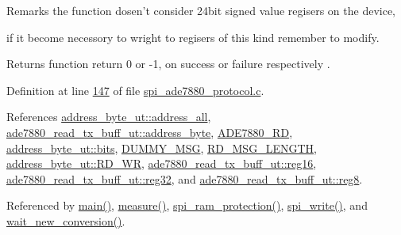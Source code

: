 \begin{DoxyRemark}{Remarks}
the function dosen't consider 24bit signed value regisers on the device, \par
 if it become necessory to wright to regisers of this kind remember to modify.
\end{DoxyRemark}
\begin{DoxyReturn}{Returns}
function return 0 or -\/1, on success or failure respectively . 

 
\end{DoxyReturn}


Definition at line \hyperlink{a00039_source_l00147}{147} of file \hyperlink{a00039_source}{spi\-\_\-ade7880\-\_\-protocol.\-c}.



References \hyperlink{a00040_source_l00023}{address\-\_\-byte\-\_\-ut\-::address\-\_\-all}, \hyperlink{a00040_source_l00146}{ade7880\-\_\-read\-\_\-tx\-\_\-buff\-\_\-ut\-::address\-\_\-byte}, \hyperlink{a00040_source_l00012}{A\-D\-E7880\-\_\-\-R\-D}, \hyperlink{a00010_ae121725fb28cc26495969d71e0e0d42e}{address\-\_\-byte\-\_\-ut\-::bits}, \hyperlink{a00040_source_l00014}{D\-U\-M\-M\-Y\-\_\-\-M\-S\-G}, \hyperlink{a00040_source_l00015}{R\-D\-\_\-\-M\-S\-G\-\_\-\-L\-E\-N\-G\-T\-H}, \hyperlink{a00040_source_l00026}{address\-\_\-byte\-\_\-ut\-::\-R\-D\-\_\-\-W\-R}, \hyperlink{a00040_source_l00150}{ade7880\-\_\-read\-\_\-tx\-\_\-buff\-\_\-ut\-::reg16}, \hyperlink{a00040_source_l00151}{ade7880\-\_\-read\-\_\-tx\-\_\-buff\-\_\-ut\-::reg32}, and \hyperlink{a00040_source_l00149}{ade7880\-\_\-read\-\_\-tx\-\_\-buff\-\_\-ut\-::reg8}.



Referenced by \hyperlink{a00034_source_l00198}{main()}, \hyperlink{a00041_source_l00040}{measure()}, \hyperlink{a00039_source_l00343}{spi\-\_\-ram\-\_\-protection()}, \hyperlink{a00039_source_l00221}{spi\-\_\-write()}, and \hyperlink{a00034_source_l00122}{wait\-\_\-new\-\_\-conversion()}.


